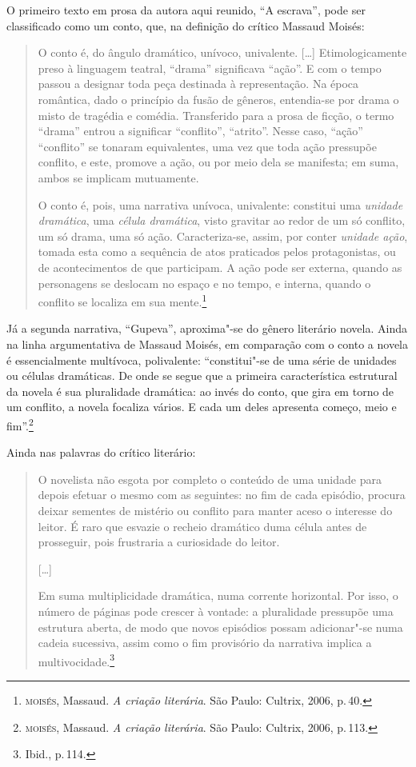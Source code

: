 O primeiro texto em prosa da autora aqui reunido, ``A escrava'', pode ser classificado como um conto, que, na definição do crítico Massaud Moisés:

\begin{quote}
O conto é, do ângulo dramático, unívoco, univalente. [\ldots]
Etimologicamente preso à linguagem teatral,
``drama'' significava ``ação''. E com o tempo passou a designar
toda peça destinada à representação. Na época romântica, dado o
princípio da fusão de gêneros, entendia-se por drama o misto de
tragédia e comédia. Transferido para a prosa de ficção, o termo
``drama'' entrou a significar ``conflito'', ``atrito''. Nesse caso,
``ação'' ``conflito'' se tonaram equivalentes, uma vez que toda
ação pressupõe conflito, e este, promove a ação, ou por meio dela
se manifesta; em suma, ambos se implicam mutuamente.

O conto é, pois, uma narrativa unívoca, univalente: constitui
uma \textit{unidade dramática}, uma \textit{célula dramática}, visto gravitar ao
redor de um só conflito, um só drama, uma só ação. Caracteriza-se,
assim, por conter \textit{unidade ação}, tomada esta como a sequência de atos praticados pelos protagonistas, ou de acontecimentos de
que participam. A ação pode ser externa, quando as personagens se
deslocam no espaço e no tempo, e interna, quando o conflito se
localiza em sua mente.\footnote{\textsc{moisés}, Massaud. \textit{A criação literária}. São Paulo: Cultrix, 2006, p.\,40.}
\end{quote}

Já a segunda narrativa, ``Gupeva'', aproxima"-se do gênero literário novela.
Ainda na linha argumentativa de Massaud Moisés, em comparação com o conto a novela é
essencialmente multívoca, polivalente: ``constitui"-se de uma série de unidades ou células dramáticas. De onde se segue que a primeira característica estrutural da novela é sua pluralidade dramática: ao invés do conto, que gira em torno de um conflito, a novela focaliza vários. E cada um deles apresenta começo, meio e fim''.\footnote{\textsc{moisés}, Massaud. \textit{A criação literária}. São Paulo: Cultrix, 2006, p.\,113.}

Ainda nas palavras do crítico literário:

\begin{quote}
O novelista não esgota por completo o conteúdo de uma unidade para depois efetuar o mesmo com as seguintes: no fim de cada episódio, procura deixar sementes de mistério ou conflito para manter aceso o interesse do leitor. É raro que esvazie o recheio dramático duma célula antes de prosseguir, pois frustraria a curiosidade do leitor.

{[}\ldots{]}

Em suma multiplicidade dramática, numa corrente horizontal. Por isso, o número de páginas pode crescer à vontade: a pluralidade pressupõe uma estrutura aberta, de modo que novos episódios possam adicionar"-se numa cadeia sucessiva, assim como o fim provisório da narrativa implica a multivocidade.\footnote{Ibid., p.\,114.}
\end{quote}

